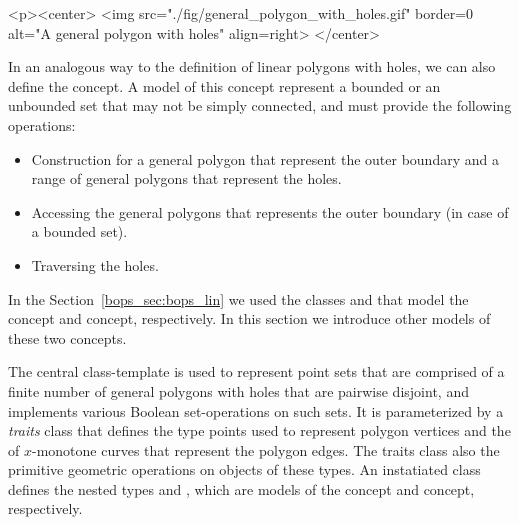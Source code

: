 \lcTex{%
  \setlength{\widthRight}{1.4cm}
  \setlength{\widthLeft}{\widthLineReal}
  \addtolength{\widthLeft}{-\widthRight}
  \begin{minipage}{\widthLeft}
}
\label{fig:general_polygon_with_holes}
\begin{ccHtmlOnly}
  <p><center>
    <img src="./fig/general_polygon_with_holes.gif" border=0 alt="A general polygon with holes" align=right>
  </center>
\end{ccHtmlOnly}
In an analogous way to the definition of linear polygons with holes, we can
also define the  concept. A model of this
concept represent a bounded or an unbounded set that may not be simply
connected, and must provide the following operations:
\\
\begin{itemize}
\item Construction for a general polygon that represent the outer boundary
and a range of general polygons that represent the holes.
\item Accessing the general polygons that represents the outer boundary
(in case of a bounded set).
\item Traversing the holes.
\end{itemize}
In the Section~\ref{bops_sec:bops_lin} we used the classes  and
 that model the  concept
and  concept, respectively. In this section
we introduce other models of these two concepts.

The central class-template  is used to
represent point sets that are comprised of a finite number of general polygons
with holes that are pairwise disjoint, and implements various Boolean
set-operations on such sets. It is parameterized by a {\em traits}
class that defines the type points used to represent polygon vertices and
the of $x$-monotone curves that represent the polygon edges. The traits
class also the primitive geometric operations on objects of these types.
An instatiated  class defines the nested types
 and
, which are models
of the  concept and 
concept, respectively.

